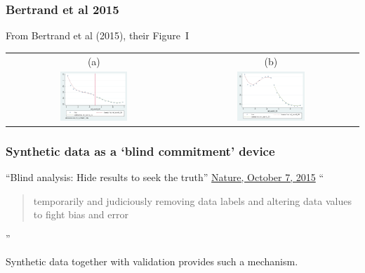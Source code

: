 \begin{frame}
	\frametitle{Bertrand et al 2015}
	\centering
	{From Bertrand et al (2015), their Figure~I}
	\begin{tabular}{cc}
		(a) & (b)\\
		\includegraphics[width=0.4\textwidth]{jma_graph_rel_earn3_syn}&\pause
		\includegraphics[width=0.4\textwidth]{jma_graph_rel_earn3}\\
	\end{tabular}
\end{frame}


\begin{frame}
	\frametitle{Synthetic data as a `blind commitment' device}
	\begin{block}{``Blind analysis: Hide results to seek the truth''}
		\href{http://www.nature.com/news/blind-analysis-hide-results-to-seek-the-truth-1.18510}{Nature, October 7, 2015}
``		\begin{quote}
			temporarily and judiciously removing data labels and altering data values to fight bias and error
		\end{quote}''
	\end{block}
	Synthetic data together with validation provides such a mechanism.
\end{frame}


